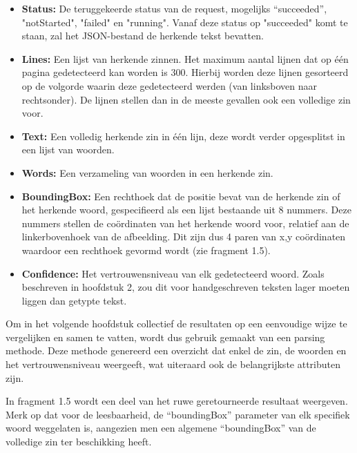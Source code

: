 \begin{itemize}
\setlength\itemsep{1em}
\item \textbf{Status:} De teruggekeerde status van de request,  mogelijks “succeeded”, "notStarted", "failed" en "running". Vanaf deze status op "succeeded" komt te staan, zal het JSON-bestand de herkende tekst bevatten.  

\item \textbf{Lines:} Een lijst van herkende zinnen. Het maximum aantal lijnen dat op één pagina gedetecteerd kan worden is 300. Hierbij worden deze lijnen gesorteerd op de volgorde waarin deze gedetecteerd werden (van linksboven naar rechtsonder). De lijnen stellen dan in de meeste gevallen ook een volledige zin voor. 

\item \textbf{Text:} Een volledig herkende zin in één lijn, deze wordt verder opgesplitst in een lijst van woorden.

\item \textbf{Words:} Een verzameling van woorden in een herkende zin.

\item \textbf{BoundingBox:} Een rechthoek dat de positie bevat van de herkende zin of het herkende woord, gespecifieerd als een lijst bestaande uit 8 nummers. Deze nummers stellen de coördinaten van het herkende woord voor, relatief aan de linkerbovenhoek van de afbeelding. Dit zijn dus 4 paren van x,y coördinaten waardoor een rechthoek gevormd wordt (zie fragment 1.5). 

\item \textbf{Confidence:} Het vertrouwensniveau van elk gedetecteerd woord. Zoals beschreven in hoofdstuk 2, zou dit voor handgeschreven teksten lager moeten liggen dan getypte tekst. 
\end{itemize}

\newpage
Om in het volgende hoofdstuk collectief de resultaten op een eenvoudige wijze te vergelijken en samen te vatten, wordt dus gebruik gemaakt van een parsing methode. Deze methode genereerd een overzicht dat enkel de zin, de woorden en het vertrouwensniveau weergeeft, wat uiteraard ook de belangrijkste attributen zijn. 



In fragment 1.5 wordt een deel van het ruwe geretourneerde resultaat weergeven. Merk op dat voor de leesbaarheid, de “boundingBox” parameter van elk specifiek woord weggelaten is, aangezien men een algemene “boundingBox” van de volledige zin ter beschikking heeft. 

